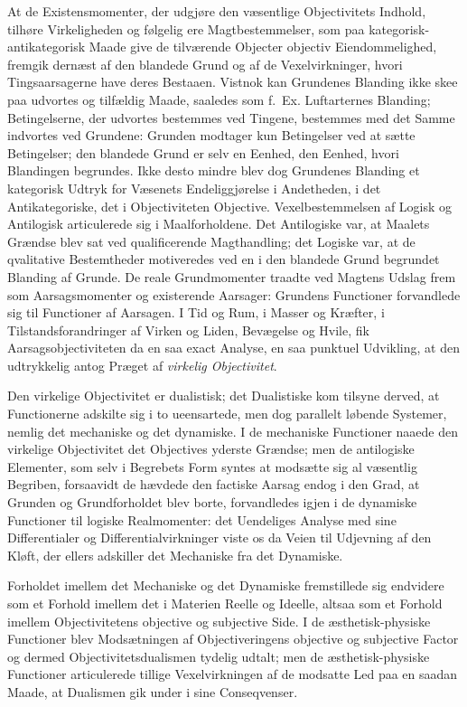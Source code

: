 \documentclass[12pt]{book}
\newcommand{\opage}[1]{\marginnote{\footnotesize\textit{[#1]}}}
\begin{document}
At de Existensmomenter, der udgjøre den væsentlige Objectivitets Indhold, tilhøre Virkeligheden
og følgelig ere Magtbestemmelser, som paa kategorisk-antikategorisk Maade give de tilværende
Objecter objectiv Eiendommelighed, fremgik dernæst af den blandede Grund og af de
Vexelvirkninger, hvori Tingsaarsagerne have deres Bestaaen. Vistnok kan Grundenes Blanding
ikke skee paa udvortes og tilfældig Maade, saaledes som f.\ Ex. Luftarternes Blanding;
Betingelserne, der udvortes bestemmes ved Tingene, bestemmes med det Samme indvortes ved
Grundene: Grunden modtager kun Betingelser ved at sætte Betingelser; den blandede Grund er selv
en Eenhed, den Eenhed, hvori Blandingen begrundes. Ikke desto mindre blev dog Grundenes Blanding
et kategorisk Udtryk for Væsenets Endeliggjørelse i Andetheden, i det Antikategoriske, det i
Objectiviteten Objective. Vexelbestemmelsen af Logisk og Antilogisk articulerede sig i
Maalforholdene. Det Antilogiske var, at Maalets Grændse blev sat ved qualificerende
Magthandling; det Logiske var, at de qvalitative Bestemtheder motiveredes ved en i den blandede
Grund begrundet Blanding af
\opage{389} Grunde. De reale Grundmomenter traadte ved Magtens Udslag frem som Aarsagsmomenter og
existerende Aarsager: Grundens Functioner forvandlede sig til Functioner af Aarsagen. I Tid og
Rum, i Masser og Kræfter, i Tilstandsforandringer af Virken og Liden, Bevægelse og Hvile, fik
Aarsagsobjectiviteten da en saa exact Analyse, en saa punktuel Udvikling, at den udtrykkelig
antog Præget af \emph{virkelig Objectivitet}.

Den virkelige Objectivitet er dualistisk; det Dualistiske kom tilsyne derved, at Functionerne
adskilte sig i to ueensartede, men dog parallelt løbende Systemer, nemlig det mechaniske og det
dynamiske. I de mechaniske Functioner naaede den virkelige Objectivitet det Objectives yderste
Grændse; men de antilogiske Elementer, som selv i Begrebets Form syntes at modsætte sig al
væsentlig Begriben, forsaavidt de hævdede den factiske Aarsag endog i den Grad, at Grunden og
Grundforholdet blev borte, forvandledes igjen i de dynamiske Functioner til logiske
Realmomenter: det Uendeliges Analyse med sine Differentialer og Differentialvirkninger viste os
da Veien til Udjevning af den Kløft, der ellers adskiller det Mechaniske fra det Dynamiske.

Forholdet imellem det Mechaniske og det Dynamiske fremstillede sig endvidere som et Forhold
imellem det i Materien Reelle og Ideelle, altsaa som et Forhold imellem Objectivitetens objective
og subjective Side. I de æsthetisk-physiske Functioner blev Modsætningen af Objectiveringens
objective og subjective Factor og dermed Objectivitetsdualismen tydelig udtalt; men de
æsthetisk-physiske Functioner articulerede tillige Vexelvirkningen af de modsatte Led paa en
saadan Maade, at Dualismen gik under i sine Conseqvenser.
\end{document}
